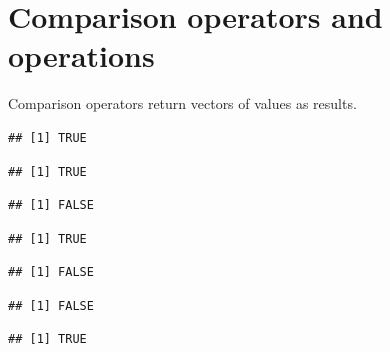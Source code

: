 \documentclass[krantz2]{krantz}\usepackage{knitr}
\begin{document}
\section{Comparison operators and operations}
\qRoperator{>}\qRoperator{<}\qRoperator{>=}\qRoperator{<=}\qRoperator{==}\qRoperator{!=}
Comparison operators return vectors of  values as results.

\begin{knitrout}\footnotesize
{}\color{fgcolor}\begin{kframe}
\begin{alltt}
 \hlopt{>} 
\end{alltt}
\begin{verbatim}
## [1] TRUE
\end{verbatim}
\begin{alltt}
 \hlopt{>=} 
\end{alltt}
\begin{verbatim}
## [1] TRUE
\end{verbatim}
\begin{alltt}
 \hlopt{==}  
\end{alltt}
\begin{verbatim}
## [1] FALSE
\end{verbatim}
\begin{alltt}
 \hlopt{!=} 
\end{alltt}
\begin{verbatim}
## [1] TRUE
\end{verbatim}
\begin{alltt}
 \hlopt{<=} 
\end{alltt}
\begin{verbatim}
## [1] FALSE
\end{verbatim}
\begin{alltt}
 \hlopt{<} 
\end{alltt}
\begin{verbatim}
## [1] FALSE
\end{verbatim}
\begin{alltt}
 \hlkwb{<-} 
 \hlopt{<}  \hlopt{&&}  \hlopt{>} 
\end{alltt}
\begin{verbatim}
## [1] TRUE
\end{verbatim}
\end{kframe}
\end{knitrout}
\end{document}
